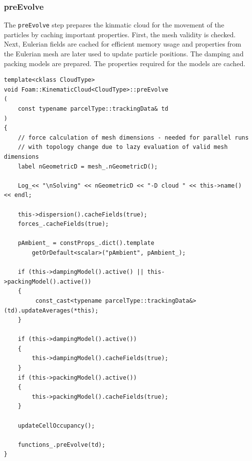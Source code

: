 \subsubsection{preEvolve}
The \lstinline|preEvolve| step prepares the kinmatic cloud for the movement of the particles by caching important properties.
First, the mesh validity is checked.
Next, Eulerian fields are cached for efficient memory usage and properties from the Eulerian mesh are later used to update particle positions.
The damping and packing models are prepared. The properties required for the models are cached.
\ifcode
\begin{lstlisting}[firstline = 782, caption=in KinematicCloud.C]
    template<cklass CloudType>
void Foam::KinematicCloud<CloudType>::preEvolve
(
    const typename parcelType::trackingData& td
)
{
    // force calculation of mesh dimensions - needed for parallel runs
    // with topology change due to lazy evaluation of valid mesh dimensions
    label nGeometricD = mesh_.nGeometricD();

    Log_<< "\nSolving" << nGeometricD << "-D cloud " << this->name() << endl;

    this->dispersion().cacheFields(true);
    forces_.cacheFields(true);

    pAmbient_ = constProps_.dict().template
        getOrDefault<scalar>("pAmbient", pAmbient_);

    if (this->dampingModel().active() || this->packingModel().active())
    {
         const_cast<typename parcelType::trackingData&>(td).updateAverages(*this);
    }

    if (this->dampingModel().active())
    {
        this->dampingModel().cacheFields(true);
    }
    if (this->packingModel().active())
    {
        this->packingModel().cacheFields(true);
    }

    updateCellOccupancy();

    functions_.preEvolve(td);
}

\end{lstlisting}
\fi

